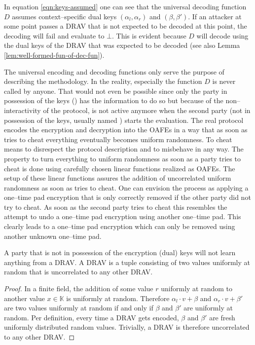 \noindent{}In equation \ref{eqn:keys-assumed} one can see that the universal
decoding function $D$ assumes context--specific dual keys $(\alpha_l, \alpha_r)$
and $(\beta, \beta')$. If an attacker at some point passes a DRAV that is not
expected to be decoded at this point, the decoding will fail and evaluate to
$\bot$. This is evident because $D$ will decode using the dual keys of the DRAV
that was expected to be decoded (see also Lemma
\ref{lem:well-formed-fun-of-dec-fun}).

The universal encoding and decoding functions only serve the purpose of
describing the methodology.  In the reality, especially the function $D$ is
never called by anyone. That would not even be possible since only the party in
possession of the keys (\JWpOne{}) has the information to do so but because of
the non--interactivity of the protocol, \JWpOne{} is not active anymore when the
second party (not in possession of the keys, usually named \JWpTwo{}) starts the
evaluation. The real protocol encodes the encryption and decryption into the
OAFEs in a way that as soon as \JWpTwo{} tries to cheat everything eventually
becomes uniform randomness. To cheat means to disrespect the protocol
description and to misbehave in any way. The property to turn everything to
uniform randomness as soon as a party tries to cheat is done using carefully
chosen linear functions realized as OAFEs. The setup of these linear functions
assures the addition of uncorrelated uniform randomness as soon as \JWpTwo{}
tries to cheat. One can envision the process as applying a one--time pad
encryption that is only correctly removed if the other party did not try to
cheat. As soon as the second party tries to cheat this resembles the attempt to
undo a one--time pad encryption using another one--time pad. This clearly leads
to a one--time pad encryption which can only be removed using another unknown
one--time pad.

\begin{lem}
  \label{lem:DRAV-random}

  A party that is not in possession of the encryption (dual) keys will not learn
  anything from a DRAV\@. A DRAV is a tuple consisting of two values uniformly
  at random that is uncorrelated to any other DRAV\@.

\end{lem}
\begin{proof}

  In a finite field, the addition of some value $r$ uniformly at random to
  another value $x \in \mathbb{K}$ is uniformly at random. Therefore $\alpha_l
  \cdot v + \beta$ and $\alpha_r \cdot v + \beta'$ are two values uniformly at
  random if and only if $\beta$ and $\beta'$ are uniformly at random. Per
  definition, every time a DRAV gets encoded, $\beta$ and $\beta'$ are fresh
  uniformly distributed random values. Trivially, a DRAV is therefore
  uncorrelated to any other DRAV\@.

\end{proof}


